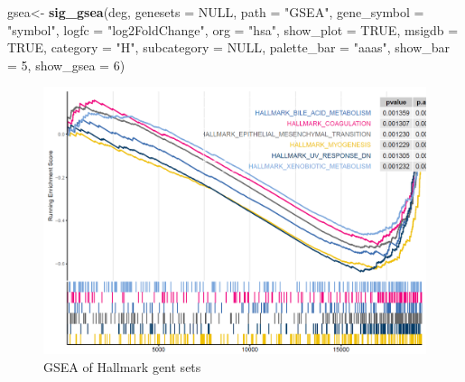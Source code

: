 \documentclass[
  12pt,
]{book}
\newenvironment{Shaded}{\begin{snugshade}}{\end{snugshade}}
\newcommand{\AttributeTok}[1]{\textcolor[rgb]{0.13,0.29,0.53}{#1}}
\newcommand{\ConstantTok}[1]{\textcolor[rgb]{0.56,0.35,0.01}{#1}}
\newcommand{\DecValTok}[1]{\textcolor[rgb]{0.00,0.00,0.81}{#1}}
\newcommand{\FunctionTok}[1]{\textcolor[rgb]{0.13,0.29,0.53}{\textbf{#1}}}
\newcommand{\NormalTok}[1]{#1}
\newcommand{\OtherTok}[1]{\textcolor[rgb]{0.56,0.35,0.01}{#1}}
\newcommand{\StringTok}[1]{\textcolor[rgb]{0.31,0.60,0.02}{#1}}
\begin{document}
\begin{Shaded}
\begin{Highlighting}[]
\NormalTok{gsea}\OtherTok{\textless{}{-}}     \FunctionTok{sig\_gsea}\NormalTok{(deg,}
                    \AttributeTok{genesets          =} \ConstantTok{NULL}\NormalTok{,}
                    \AttributeTok{path              =} \StringTok{"GSEA"}\NormalTok{,}
                    \AttributeTok{gene\_symbol       =} \StringTok{"symbol"}\NormalTok{,}
                    \AttributeTok{logfc             =} \StringTok{"log2FoldChange"}\NormalTok{,}
                    \AttributeTok{org               =} \StringTok{"hsa"}\NormalTok{,}
                    \AttributeTok{show\_plot         =} \ConstantTok{TRUE}\NormalTok{,}
                    \AttributeTok{msigdb            =} \ConstantTok{TRUE}\NormalTok{,}
                    \AttributeTok{category          =} \StringTok{"H"}\NormalTok{,}
                    \AttributeTok{subcategory       =} \ConstantTok{NULL}\NormalTok{,}
                    \AttributeTok{palette\_bar       =} \StringTok{"aaas"}\NormalTok{,}
                    \AttributeTok{show\_bar          =} \DecValTok{5}\NormalTok{,}
                    \AttributeTok{show\_gsea         =} \DecValTok{6}\NormalTok{)}
\end{Highlighting}
\end{Shaded}

\begin{figure}

{\centering \includegraphics[width=0.95\linewidth]{./fig/gsea-2} 

}

\caption{GSEA of Hallmark gent sets}\label{fig:unnamed-chunk-11}
\end{figure}
\end{document}
